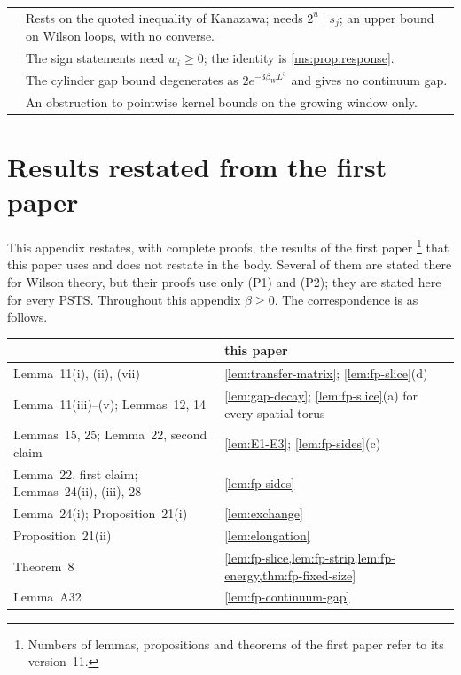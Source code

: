 \documentclass[11pt,a4paper]{amsart}
\theoremstyle{definition}
\theoremstyle{remark}
\numberwithin{equation}{section}
\newcommand{\PSTS}{\textup{PSTS}}          %
\newcommand{\betaW}{\beta_{W}}             %
\begin{document}
{\begin{longtable}{@{}p{}p{}@{}}
{prop:hamiltonian-TY} & Rests on the quoted inequality of Kanazawa; needs $2^u\mid s_j$; an upper bound on Wilson loops, with no converse.\\
{prop:thermal-response} & The sign statements need $w_i\ge0$; the identity is \cref{ms:prop:response}.\\
{ms:thm:Wilson-cylinder} & The cylinder gap bound degenerates as $2e^{-3\betaW L^3}$ and gives no continuum gap.\\
{ms:prop:window-failure} & An obstruction to pointwise kernel bounds on the growing window only.\\
\bottomrule
\end{longtable}}
\section{Results restated from the first paper}\label{app:first-paper}

This appendix restates, with complete proofs, the results of the first paper \cite{bhattacharjee2026first}\footnote{Numbers of lemmas, propositions and theorems of the first paper refer to its version~11.} that this paper uses and does not restate in the body. Several of them are stated there for Wilson theory, but their proofs use only (P1) and (P2); they are stated here for every \PSTS{}. Throughout this appendix $\beta\ge0$. The correspondence is as follows.
\begin{center}
\small
\begin{tabular}{@{}ll@{}}
\toprule
\cite{bhattacharjee2026first} & this paper\\
\midrule
Lemma~11(i), (ii), (vii) & \cref{lem:transfer-matrix}; \cref{lem:fp-slice}(d)\\
Lemma~11(iii)--(v); Lemmas~12, 14 & \cref{lem:gap-decay}; \cref{lem:fp-slice}(a) for every spatial torus\\
Lemmas~15, 25; Lemma~22, second claim & \cref{lem:E1-E3}; \cref{lem:fp-sides}(c)\\
Lemma~22, first claim; Lemmas~24(ii), (iii), 28 & \cref{lem:fp-sides}\\
Lemma~24(i); Proposition~21(i) & \cref{lem:exchange}\\
Proposition~21(ii) & \cref{lem:elongation}\\
Theorem~8 & \cref{lem:fp-slice,lem:fp-strip,lem:fp-energy,thm:fp-fixed-size}\\
Lemma~A32 & \cref{lem:fp-continuum-gap}\\
\bottomrule
\end{tabular}
\end{center}
\end{document}
